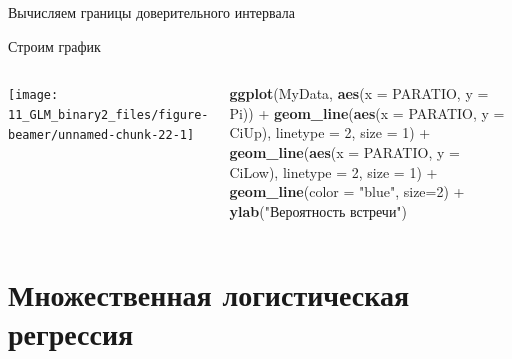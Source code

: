 \documentclass[ignorenonframetext,]{beamer}
\newenvironment{Shaded}{\begin{snugshade}}{\end{snugshade}}
\newcommand{\KeywordTok}[1]{\textcolor[rgb]{0.13,0.29,0.53}{\textbf{{#1}}}}
\newcommand{\DataTypeTok}[1]{\textcolor[rgb]{0.13,0.29,0.53}{{#1}}}
\newcommand{\DecValTok}[1]{\textcolor[rgb]{0.00,0.00,0.81}{{#1}}}
\newcommand{\FloatTok}[1]{\textcolor[rgb]{0.00,0.00,0.81}{{#1}}}
\newcommand{\StringTok}[1]{\textcolor[rgb]{0.31,0.60,0.02}{{#1}}}
\newcommand{\CommentTok}[1]{\textcolor[rgb]{0.56,0.35,0.01}{\textit{{#1}}}}
\newcommand{\NormalTok}[1]{{#1}}
\newcommand{\columnsbegin}{\begin{columns}}
\newcommand{\columnsend}{\end{columns}}
\begin{document}
\begin{frame}[fragile]{Вычисляем границы доверительного интервала}

\begin{Shaded}
\end{Shaded}

\end{frame}

\begin{frame}[fragile]{Строим график}

\columnsbegin
{}

\begin{flushleft}\texttt{[image: 11\_GLM\_binary2\_files/figure-beamer/unnamed-chunk-22-1]} \end{flushleft}


\begin{Shaded}
\begin{Highlighting}[]
\KeywordTok{ggplot}\NormalTok{(MyData, }\KeywordTok{aes}\NormalTok{(}\DataTypeTok{x =} \NormalTok{PARATIO, }\DataTypeTok{y =} \NormalTok{Pi)) +}
\StringTok{  }\KeywordTok{geom_line}\NormalTok{(}\KeywordTok{aes}\NormalTok{(}\DataTypeTok{x =} \NormalTok{PARATIO, }\DataTypeTok{y =} \NormalTok{CiUp),}
            \DataTypeTok{linetype =} \DecValTok{2}\NormalTok{, }\DataTypeTok{size =} \DecValTok{1}\NormalTok{) +}
\StringTok{  }\KeywordTok{geom_line}\NormalTok{(}\KeywordTok{aes}\NormalTok{(}\DataTypeTok{x =} \NormalTok{PARATIO, }\DataTypeTok{y =} \NormalTok{CiLow),}
            \DataTypeTok{linetype =} \DecValTok{2}\NormalTok{, }\DataTypeTok{size =} \DecValTok{1}\NormalTok{) +}
\StringTok{  }\KeywordTok{geom_line}\NormalTok{(}\DataTypeTok{color =} \StringTok{"blue"}\NormalTok{, }\DataTypeTok{size=}\DecValTok{2}\NormalTok{) +}
\StringTok{  }\KeywordTok{ylab}\NormalTok{(}\StringTok{"Вероятность встречи"}\NormalTok{)}
\end{Highlighting}
\end{Shaded}

\columnsend

\end{frame}

\section{Множественная логистическая регрессия}\label{--}
\end{document}
